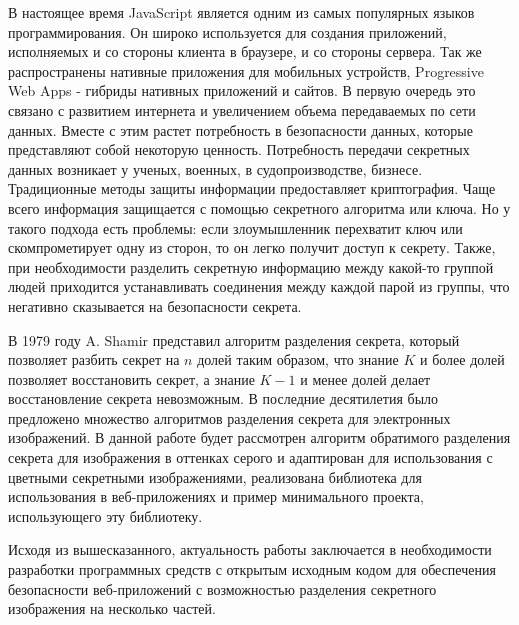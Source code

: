 \documentclass[a4paper,article,14pt]{extarticle}
\begin{document}


\tableofcontents
\pagebreak

В настоящее время JavaScript является одним из самых популярных языков программирования. Он широко используется для создания приложений,
исполняемых и со стороны клиента в браузере, и со стороны сервера. Так же распространены нативные приложения для мобильных устройств, 
Progressive Web Apps - гибриды нативных приложений и сайтов. В первую очередь это связано с развитием интернета и увеличением объема
передаваемых по сети данных. Вместе с этим растет потребность в безопасности данных, которые представляют собой некоторую ценность.
Потребность передачи секретных данных возникает у ученых, военных, в судопроизводстве, бизнесе. 
Традиционные методы защиты информации предоставляет криптография. Чаще всего информация защищается с помощью секретного алгоритма или ключа.
Но у такого подхода есть проблемы: если злоумышленник перехватит ключ или скомпрометирует одну из сторон, то он легко получит доступ к секрету.
Также, при необходимости разделить секретную информацию между какой-то группой людей приходится устанавливать соединения между каждой парой из группы,
что негативно сказывается на безопасности секрета.

В 1979 году A. Shamir представил \cite{shamir} алгоритм 
разделения секрета, который позволяет разбить секрет на $n$ долей таким образом, что знание $K$ и более долей позволяет восстановить 
секрет, а знание $K-1$ и менее долей делает восстановление секрета невозможным. В последние десятилетия было предложено множество 
алгоритмов разделения секрета для электронных изображений. В данной работе будет рассмотрен алгоритм обратимого 
разделения секрета для изображения в оттенках серого и адаптирован для использования с цветными секретными изображениями,
реализована библиотека для использования в веб-приложениях и пример минимального проекта, использующего эту 
библиотеку.

Исходя из вышесказанного, актуальность работы заключается в необходимости разработки программных средств с открытым исходным кодом
для обеспечения безопасности веб-приложений с возможностью разделения секретного изображения на несколько частей.

\newpage
{}
\end{document}
